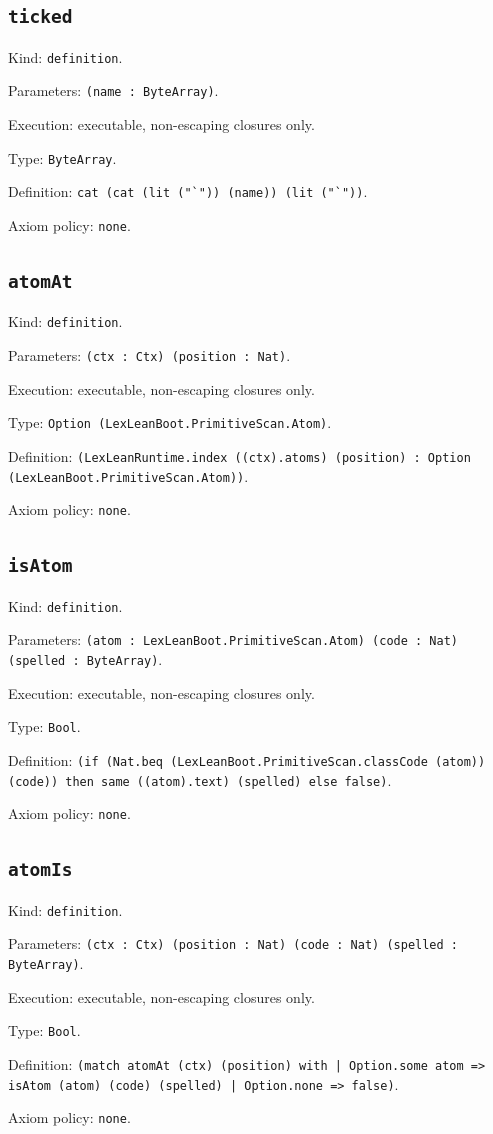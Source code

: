 \documentclass[11pt]{article}
\begin{document}
\subsection*{\texttt{ticked}}
\noindent Kind: \texttt{definition}.\par
\noindent Parameters: \texttt{(name : ByteArray)}.\par
\noindent Execution: executable, non-escaping closures only.\par
\noindent Type: \texttt{ByteArray}.\par
\noindent Definition: \texttt{cat (cat (lit ("`")) (name)) (lit ("`"))}.\par
\noindent Axiom policy: \texttt{none}.\par
\subsection*{\texttt{atomAt}}
\noindent Kind: \texttt{definition}.\par
\noindent Parameters: \texttt{(ctx : Ctx) (position : Nat)}.\par
\noindent Execution: executable, non-escaping closures only.\par
\noindent Type: \texttt{Option (LexLeanBoot.PrimitiveScan.Atom)}.\par
\noindent Definition: \texttt{(LexLeanRuntime.index ((ctx).atoms) (position) : Option (LexLeanBoot.PrimitiveScan.Atom))}.\par
\noindent Axiom policy: \texttt{none}.\par
\subsection*{\texttt{isAtom}}
\noindent Kind: \texttt{definition}.\par
\noindent Parameters: \texttt{(atom : LexLeanBoot.PrimitiveScan.Atom) (code : Nat) (spelled : ByteArray)}.\par
\noindent Execution: executable, non-escaping closures only.\par
\noindent Type: \texttt{Bool}.\par
\noindent Definition: \texttt{(if (Nat.beq (LexLeanBoot.PrimitiveScan.classCode (atom)) (code)) then same ((atom).text) (spelled) else false)}.\par
\noindent Axiom policy: \texttt{none}.\par
\subsection*{\texttt{atomIs}}
\noindent Kind: \texttt{definition}.\par
\noindent Parameters: \texttt{(ctx : Ctx) (position : Nat) (code : Nat) (spelled : ByteArray)}.\par
\noindent Execution: executable, non-escaping closures only.\par
\noindent Type: \texttt{Bool}.\par
\noindent Definition: \texttt{(match atomAt (ctx) (position) with | Option.some atom => isAtom (atom) (code) (spelled) | Option.none => false)}.\par
\noindent Axiom policy: \texttt{none}.\par
\end{document}

